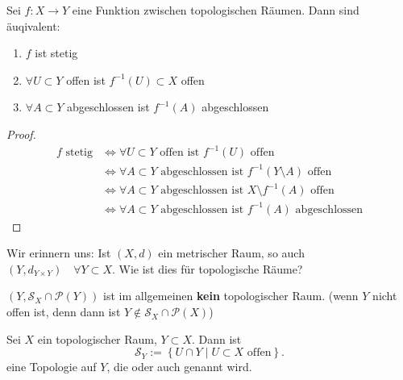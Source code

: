 \begin{theorem}\label{thm:stetig-gdw-urbilder-abgeschlossener-mengen-sind-abgeschlossen}
    Sei $f:X \to  Y$ eine Funktion zwischen topologischen Räumen. Dann sind äuqivalent:
    \begin{enumerate}[1)]
        \item $f$ ist stetig
        \item $\forall U\subset Y$ offen ist $f^{-1}(U) \subset X$ offen
        \item  $\forall A\subset Y$ abgeschlossen ist $f^{-1}(A)$ abgeschlossen
    \end{enumerate}
\end{theorem}
\begin{proof}
    \begin{equation*}
        \begin{split}
            f \text{ stetig} &\iff \forall U \subset  Y \text{ offen ist } f^{-1}(U) \text{ offen}  \\
                             &\iff  \forall A \subset Y \text{ abgeschlossen ist } f^{-1}(Y \setminus A) \text{ offen} \\
                             &\iff \forall A\subset Y \text{ abgeschlossen ist } X \setminus f^{-1}(A) \text{ offen} \\
                             &\iff  \forall A\subset Y \text{ abgeschlossen ist } f^{-1}(A) \text{ abgeschlossen}
        \end{split}
    \end{equation*}
\end{proof}


Wir erinnern uns: Ist $(X,d)$ ein metrischer Raum, so auch  $\left(Y, d_{Y\times Y}\right) \quad \forall Y\subset X$. Wie ist dies für topologische Räume?
\begin{warning}
    $(Y, \mathcal{S}_X \cap \mathcal{P}(Y))$ ist im allgemeinen \textbf{kein} topologischer Raum. (wenn $Y$ nicht offen ist, denn dann ist $Y\not\in \mathcal{S}_X \cap \mathcal{P}(X)$)
\end{warning}
\begin{theoremdef}[Teilraumtopologie]\label{def:teilraumtopologie}
    Sei $X$ ein topologischer Raum,  $Y\subset X$. Dann ist
    \[
    \mathcal{S}_Y := \left \{U \cap Y \mid  U\subset X \text{ offen}\right\} 
    .\] 
    eine Topologie auf $Y$, die   oder auch  genannt wird.  
\end{theoremdef}

